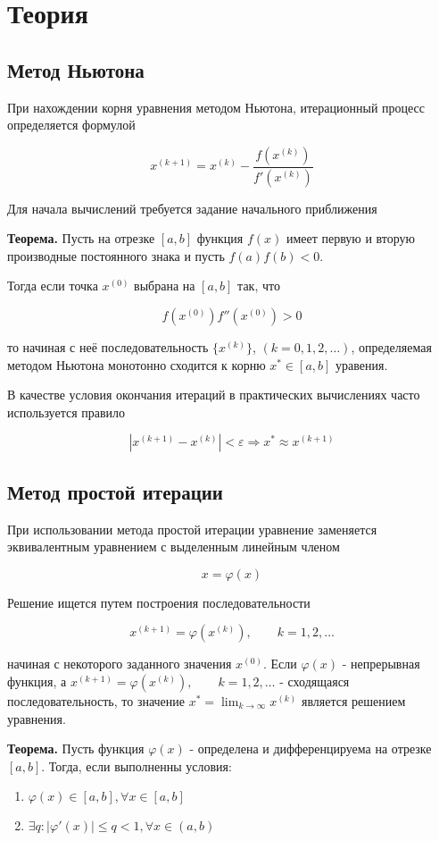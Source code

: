 \section*{Теория}

\subsection*{Метод Ньютона}

При нахождении корня уравнения методом Ньютона,
итерационный процесс определяется
формулой

$$x^{(k+1)} = x^{(k)}-\frac{f(x^{(k)})}{f'(x^{(k)})}$$

Для начала вычислений требуется задание начального приближения

\textbf{Теорема.} Пусть на отрезке $[a, b]$ функция $f(x)$ имеет первую и
вторую производные постоянного знака и пусть $f(a)f(b) < 0$.

Тогда если точка $x^{(0)}$ выбрана на $[a, b]$ так, что 

$$f(x^{(0)})f''(x^{(0)})>0$$

то начиная с неё последовательность $\{x^{(k)}\}$, $(k=0,1,2,\dots)$,
определяемая методом Ньютона монотонно сходится к корню 
$x^* \in [a,b]$ уравения.

В качестве условия окончания итераций в практических вычислениях часто
используется правило

$$|x^{(k+1)}-x^{(k)}| < \varepsilon \Rightarrow x^* \approx x^{(k+1)}$$

\subsection*{Метод простой итерации}

При использовании метода простой итерации уравнение заменяется эквивалентным
уравнением с выделенным линейным членом

$$x = \varphi(x)$$

Решение ищется путем построения последовательности

$$x^{(k+1)} = \varphi(x^{(k)}), \qquad k = 1,2,\dots$$

начиная с некоторого заданного значения $x^{(0)}$. Если $\varphi(x)$ - непрерывная
функция, а $x^{(k+1)} = \varphi(x^{(k)}), \qquad k = 1,2,\dots$ -
сходящаяся последовательность, то значение
$x^* = \lim_{k\rightarrow \infty} x^{(k)}$
является решением уравнения.

\pagebreak

\textbf{Теорема.} Пусть функция $\varphi(x)$ - определена и 
дифференцируема на отрезке $[a,b]$. Тогда, если выполненны условия:
\begin{enumerate}
    \item $\varphi(x)\in[a,b], \forall x\in[a,b]$
    \item $\exists q:|\varphi'(x)|\leq q < 1, \forall x\in (a,b)$
\end{enumerate}

